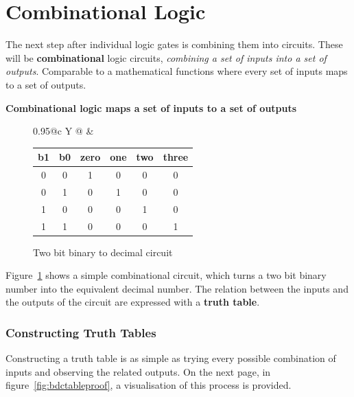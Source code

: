\documentclass[12pt, a4paper, oneside]{memoir}
\newcommand{\attention}[1]{\begin{center}\colorbox{attention}{\textbf{#1}}\end{center}}
\begin{document}
\section{Combinational Logic}
The next step after individual logic gates is combining them into circuits. These will be \textbf{combinational} logic circuits, \textit{combining a set of inputs into a set of outputs}.
Comparable to a mathematical functions where every set of inputs maps to a set of outputs.
\attention{Combinational logic maps a set of inputs to a set of outputs}
\begin{figure}[ht]
  \centering
  \begin{tabularx}{0.95\linewidth}{@{}c Y @{}}
    \raisebox{-0.16\linewidth}{}
  &   
    \begin{tabular}{cc|cccc}
      \toprule
      b1 & b0 & zero & one & two & three \\
      \midrule
      0 &   0 &    1 &   0 &   0 &    0  \\
      0 &   1 &    0 &   1 &   0 &    0  \\ 
      1 &   0 &    0 &   0 &   1 &    0  \\ 
      1 &   1 &    0 &   0 &   0 &    1  \\ 
      \bottomrule
    \end{tabular}
    \noindent
  \end{tabularx}
  \noindent
  \caption{Two bit binary to decimal circuit}
\label{fig:2bBDC}
\end{figure}

Figure~\ref{fig:2bBDC} shows a simple combinational circuit, which turns a two bit binary number into the equivalent decimal number.
The relation between the inputs and the outputs of the circuit are expressed with a \textbf{truth table}.

\subsubsection{Constructing Truth Tables}
Constructing a truth table is as simple as trying every possible combination of inputs and observing the related outputs.
On the next page, in figure~\ref{fig:bdctableproof}, a visualisation of this process is provided.
\end{document}
